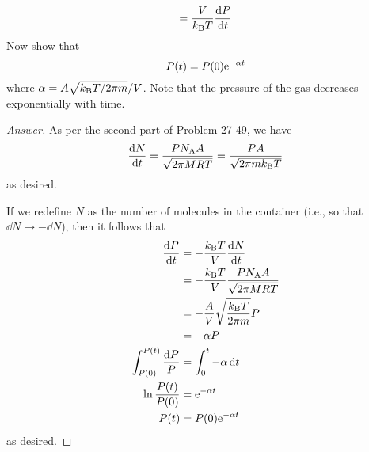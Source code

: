 \documentclass[../psets.tex]{subfiles}
\begin{document}
\begin{enumerate}[label={\textbf{27-\arabic*.}},leftmargin=3.5em]
\begin{equation*}
        = \frac{V}{\kB T}\dv{P}{t}
    \end{equation*}
    Now show that
    \begin{equation*}
        P(t) = P(0)\e[-\alpha t]
    \end{equation*}
    where $\alpha=A\sqrt{\kB T/2\pi m}/V$. Note that the pressure of the gas decreases exponentially with time.
    \begin{proof}[Answer]
        As per the second part of Problem 27-49, we have
        \begin{equation*}
            \dv{N}{t} = \frac{P\NA A}{\sqrt{2\pi MRT}}
            = \frac{PA}{\sqrt{2\pi m\kB T}}
        \end{equation*}
        as desired.\par
        If we redefine $N$ as the number of molecules in the container (i.e., so that $\dd{N}\to -\dd{N}$), then it follows that
        \begin{align*}
            \dv{P}{t} &= -\frac{\kB T}{V}\dv{N}{t}\\
            &= -\frac{\kB T}{V}\frac{P\NA A}{\sqrt{2\pi MRT}}\\
            &= -\frac{A}{V}\sqrt{\frac{\kB T}{2\pi m}}P\\
            &= -\alpha P\\
            \int_{P(0)}^{P(t)}\frac{\dd{P}}{P} &= \int_0^t-\alpha\dd{t}\\
            \ln\frac{P(t)}{P(0)} &= \e[-\alpha t]\\
            P(t) &= P(0)\e[-\alpha t]
        \end{align*}
        as desired.
    \end{proof}
\end{enumerate}
\end{document}
